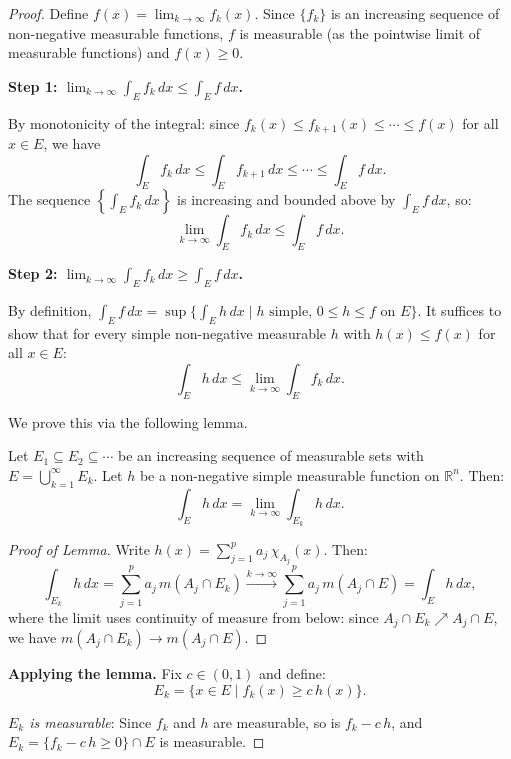 \documentclass[11pt]{report}
\begin{document}
\begin{proof}
Define $f(x) = \lim_{k \to \infty} f_k(x)$. Since $\{f_k\}$ is an increasing sequence of non-negative measurable functions, $f$ is measurable (as the pointwise limit of measurable functions) and $f(x) \geq 0$.

\textbf{Step 1: $\lim_{k \to \infty} \int_E f_k\,dx \leq \int_E f\,dx$.}

By monotonicity of the integral: since $f_k(x) \leq f_{k+1}(x) \leq \cdots \leq f(x)$ for all $x \in E$, we have
\[
\int_E f_k\,dx \leq \int_E f_{k+1}\,dx \leq \cdots \leq \int_E f\,dx.
\]
The sequence $\left\{\int_E f_k\,dx\right\}$ is increasing and bounded above by $\int_E f\,dx$, so:
\[
\lim_{k \to \infty} \int_E f_k\,dx \leq \int_E f\,dx.
\]

\textbf{Step 2: $\lim_{k \to \infty} \int_E f_k\,dx \geq \int_E f\,dx$.}

By definition, $\int_E f\,dx = \sup\bigl\{\int_E h\,dx \mid h \text{ simple, } 0 \leq h \leq f \text{ on } E\bigr\}$. It suffices to show that for every simple non-negative measurable $h$ with $h(x) \leq f(x)$ for all $x \in E$:
\[
\int_E h\,dx \leq \lim_{k \to \infty} \int_E f_k\,dx.
\]

We prove this via the following lemma.

\begin{lembox}
Let $E_1 \subseteq E_2 \subseteq \cdots$ be an increasing sequence of measurable sets with $E = \bigcup_{k=1}^{\infty} E_k$. Let $h$ be a non-negative simple measurable function on $\mathbb{R}^n$. Then:
\[
\int_E h\,dx = \lim_{k \to \infty} \int_{E_k} h\,dx.
\]
\end{lembox}

\begin{proof}[Proof of Lemma]
Write $h(x) = \sum_{j=1}^{p} a_j\,\chi_{A_j}(x)$. Then:
\[
\int_{E_k} h\,dx = \sum_{j=1}^{p} a_j\,m(A_j \cap E_k) \xrightarrow{k \to \infty} \sum_{j=1}^{p} a_j\,m(A_j \cap E) = \int_E h\,dx,
\]
where the limit uses continuity of measure from below: since $A_j \cap E_k \nearrow A_j \cap E$, we have $m(A_j \cap E_k) \to m(A_j \cap E)$.
\end{proof}

\textbf{Applying the lemma.} Fix $c \in (0, 1)$ and define:
\[
E_k = \{x \in E \mid f_k(x) \geq c\,h(x)\}.
\]

\textit{$E_k$ is measurable}: Since $f_k$ and $h$ are measurable, so is $f_k - c\,h$, and $E_k = \{f_k - c\,h \geq 0\} \cap E$ is measurable.


\end{proof}
\end{document}
